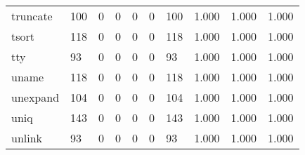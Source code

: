 \begin{longtable}{lp{2.0cm}p{2.0cm}p{2.0cm}p{2.0cm}p{2.0cm}p{2.0cm}p{2.0cm}p{2.0cm}p{2.0cm}}
truncate  &                    100 &                                  0 &                                 0 &                                0 &                                 0 &                             100 &                                1.000 &                                  1.000 &                                1.000 \\
tsort     &                    118 &                                  0 &                                 0 &                                0 &                                 0 &                             118 &                                1.000 &                                  1.000 &                                1.000 \\
tty       &                     93 &                                  0 &                                 0 &                                0 &                                 0 &                              93 &                                1.000 &                                  1.000 &                                1.000 \\
uname     &                    118 &                                  0 &                                 0 &                                0 &                                 0 &                             118 &                                1.000 &                                  1.000 &                                1.000 \\
unexpand  &                    104 &                                  0 &                                 0 &                                0 &                                 0 &                             104 &                                1.000 &                                  1.000 &                                1.000 \\
uniq      &                    143 &                                  0 &                                 0 &                                0 &                                 0 &                             143 &                                1.000 &                                  1.000 &                                1.000 \\
unlink    &                     93 &                                  0 &                                 0 &                                0 &                                 0 &                              93 &                                1.000 &                                  1.000 &                                1.000 \\

\end{longtable}
